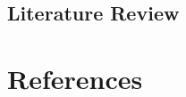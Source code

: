 \documentclass[12pt,nobind, a4paper]{reedthesis}
\begin{document}
 \hypertarget{literature-review}{%
 \section{Literature Review}\label{literature-review}}

 \backmatter

 \hypertarget{references}{%
 \chapter*{References}\label{references}}


 \noindent

 \setlength{\parindent}{-0.20in}

 \hypertarget{refs}{}
\end{document}
